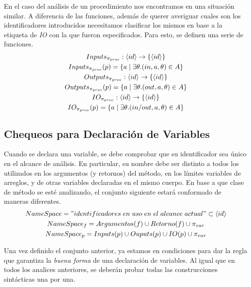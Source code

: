 \documentclass{article}
\begin{document}
En el caso del análisis de un procedimiento nos encontramos en una situación similar.
A diferencia de las funciones, además de querer averiguar cuales son los identificadores introducidos necesitamos clasificar los mismos en base a la etiqueta de \textit{IO} con la que fueron especificados.
Para esto, se definen una serie de funciones.
\begin{gather*}
Inputs_{\pi_{proc}}: \langle id \rangle \rightarrow \{ \langle id \rangle \}
\\
Inputs_{\pi_{proc}}(p) = \{ a \mid \exists \theta. (in, a, \theta) \in A \}
\\
Outputs_{\pi_{proc}}: \langle id \rangle \rightarrow \{ \langle id \rangle \}
\\
Outputs_{\pi_{proc}}(p) = \{ a \mid \exists \theta. (out, a, \theta) \in A \}
\\
IO_{\pi_{proc}}: \langle id \rangle \rightarrow \{ \langle id \rangle \}
\\
IO_{\pi_{proc}}(p) = \{ a \mid \exists \theta. (in/out, a, \theta) \in A \}
\end{gather*}

\subsection{Chequeos para Declaración de Variables}

Cuando se declara una variable, se debe comprobar que su identificador sea único en el alcance de análisis.
En particular, su nombre debe ser distinto a todos los utilizados en los argumentos (y retornos) del método, en los límites variables de arreglos, y de otras variables declaradas en el mismo cuerpo.
En base a que clase de método se esté analizando, el conjunto siguiente estará conformado de maneras diferentes.
\begin{gather*}
NameSpace =
"identificadores \; en \; uso \; en \; el \; alcance \; actual" 
\subset \langle id \rangle
\\
NameSpace_f =
Argumentos(f) \cup Retorno(f) \cup \pi_{var}
\\
NameSpace_p =
Inputs(p) \cup Ouputs(p) \cup IO(p) \cup \pi_{var}
\end{gather*}

Una vez definido el conjunto anterior, ya estamos en condiciones para dar la regla que garantiza la \textit{buena forma} de una declaración de variables.
Al igual que en todos los analices anteriores, se deberán probar todas las construcciones sintácticas una por una.
\end{document}
